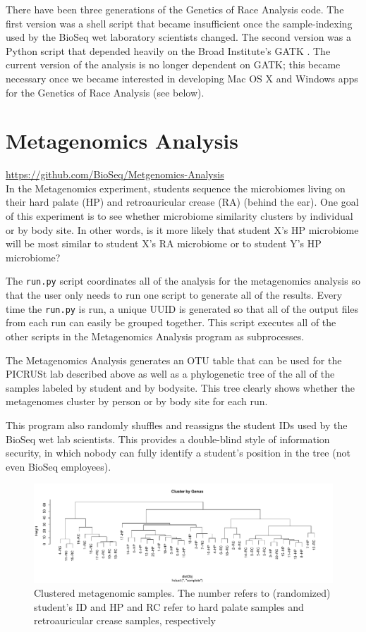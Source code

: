 \documentclass{report}
\begin{document}
There have been three generations of the Genetics of Race Analysis code. The first version was a shell script that became insufficient once the sample-indexing used by the BioSeq wet laboratory scientists changed. The second version was a Python script that depended heavily on the Broad Institute's GATK  \cite{mckenna2010genome}. The current version of the analysis is no longer dependent on GATK; this became necessary once we became interested in developing Mac OS X and Windows apps for the Genetics of Race Analysis (see below).

\section{Metagenomics Analysis}
\url{https://github.com/BioSeq/Metgenomics-Analysis}\\

\noindent In the Metagenomics experiment, students sequence the microbiomes living on their hard palate (HP) and retroauricular crease (RA) (behind the ear). One goal of this experiment is to see whether microbiome similarity clusters by individual or by body site. In other words, is it more likely that student X's HP microbiome will be most similar to student X's RA microbiome or to student Y's HP microbiome?

The \texttt{run.py} script coordinates all of the analysis for the metagenomics analysis so that the user only needs to run one script to generate all of the results. Every time the \texttt{run.py} is run, a unique UUID is generated so that all of the output files from each run can easily be grouped together. This script executes all of the other scripts in the Metagenomics Analysis program as subprocesses.

The Metagenomics Analysis generates an OTU table that can be used for the PICRUSt lab described above as well as a phylogenetic tree of the all of the samples labeled by student and by bodysite. This tree clearly shows whether the metagenomes cluster by person or by body site for each run. 

This program also randomly shuffles and reassigns the student IDs used by the BioSeq wet lab scientists. This provides a double-blind style of information security, in which nobody can fully identify a student's position in the tree (not even BioSeq employees). 

\begin{figure}[h]
\includegraphics[width=\linewidth]{tree.pdf}
\caption{Clustered metagenomic samples. The number refers to (randomized) student's ID and HP and RC refer to hard palate samples and retroauricular crease samples, respectively}
\end{figure}
\end{document}
